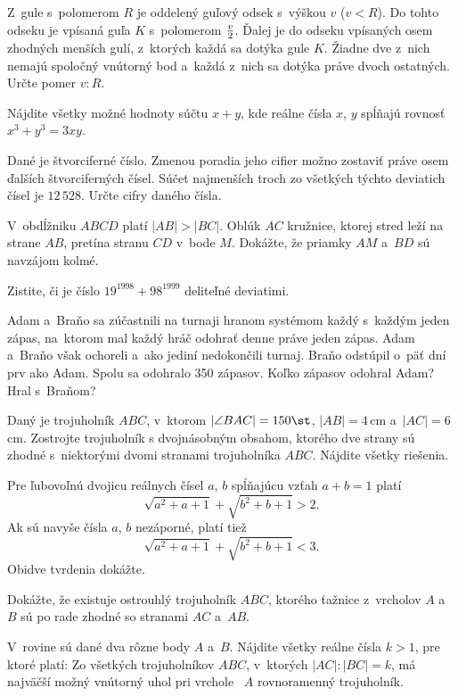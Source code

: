 {%
Z~gule s~polomerom $R$ je oddelený guľový odsek s~výškou $v$
($v<R$). Do tohto odseku je vpísaná guľa $K$ s~polomerom $v\over2$.
Ďalej je do odseku vpísaných osem zhodných menších gulí,
z~ktorých každá sa dotýka gule $K$. Žiadne dve z~nich nemajú spoločný
vnútorný bod a~každá z~nich sa dotýka práve dvoch ostatných.
Určte pomer $v:R$.}

{%
Nájdite všetky možné hodnoty súčtu $x+y$,
kde reálne čísla $x$, $y$ spĺňajú rovnosť $x^3+y^3=3xy$.}

{%
Dané je štvorciferné číslo. Zmenou poradia jeho cifier možno zostaviť práve osem
ďalších štvorciferných čísel. Súčet najmenších troch zo
všetkých týchto deviatich čísel je $12\,528$.
Určte cifry daného čísla.}

{%
V~obdĺžniku $ABC\!D$ platí $|AB|>|BC|$.
Oblúk $AC$ kružnice, ktorej stred leží na strane $AB$,
pretína stranu $C\!D$ v~bode $M$. Dokážte, že priamky $AM$ a~$BD$
sú navzájom kolmé.}

{%
Zistite, či je číslo $19^{1998}+98^{1999}$ deliteľné deviatimi.}

{%
Adam a~Braňo sa zúčastnili na turnaji hranom systémom každý
s~každým jeden zápas, na~ktorom mal každý hráč odohrať denne práve
jeden zápas. Adam a~Braňo však ochoreli a~ako jediní
nedokončili turnaj. Braňo odstúpil o~päť dní prv ako Adam.
Spolu sa odohralo 350 zápasov. Koľko zápasov odohral Adam?
Hral s~Braňom?}

{%
Daný je trojuholník $ABC$, v~ktorom $|\angle BAC|=150\st$,
$|AB|=4$\,cm a~$|AC|=6$\,cm.
Zostrojte trojuholník s dvojnásobným obsahom,
ktorého dve strany sú zhodné s~niektorými dvomi stranami
trojuholníka $ABC$. Nájdite všetky riešenia.}

{%
Pre ľubovoľnú dvojicu reálnych čísel $a$, $b$ spĺňajúcu vzťah $a+b=1$
platí
$$
\sqrt{a^2+a+1}+\sqrt{b^2+b+1}>2.
$$
Ak sú navyše čísla $a$, $b$ nezáporné, platí tiež
$$
\sqrt{a^2+a+1}+\sqrt{b^2+b+1}<3.
$$
Obidve tvrdenia dokážte.}

{%
Dokážte, že existuje ostrouhlý trojuholník $ABC$, ktorého
ťažnice z~vrcholov $A$ a~$B$ sú po rade zhodné so stranami
$AC$ a~$AB$.}

{%
V~rovine sú dané dva rôzne body $A$ a~$B$.
Nájdite všetky reálne čísla $k>1$, pre ktoré platí:
Zo všetkých trojuholníkov $ABC$, v~ktorých $|AC|:|BC| = k$,
má najväčší možný vnútorný uhol pri vrchole~ $A$  rovnoramenný trojuholník.}

